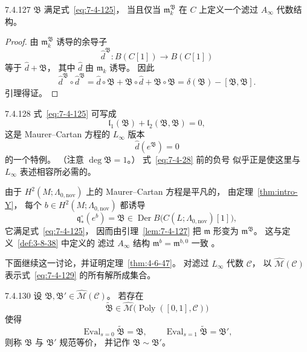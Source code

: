 \begin{lemma}{7.4.127}\label{lem:7-4-127}
$\mathfrak B$ 满足式~\eqref{eq:7-4-125}，
当且仅当 $\mathfrak m_k^{\mathfrak B}$
在 $C$ 上定义一个滤过 $A_\infty$ 代数结构。
\end{lemma}

\begin{proof}
由 $\mathfrak m_k^{\mathfrak B}$ 诱导的余导子
\[
\widehat d^{\mathfrak B}\colon
B(C[1])\longrightarrow B(C[1])
\]
等于 $\widehat d+\mathfrak B$，
其中 $\widehat d$ 由 $\mathfrak m_k$ 诱导。
因此
\[
\widehat d^{\mathfrak B}\circ
\widehat d^{\mathfrak B}
=\widehat d\circ\mathfrak B
+\mathfrak B\circ\widehat d
+\mathfrak B\circ\mathfrak B
=\delta(\mathfrak B)-[\mathfrak B,\mathfrak B].
\]
引理得证。
\end{proof}

\begin{remark}{7.4.128}\label{rem:7-4-128}
式~\eqref{eq:7-4-125} 可写成
\begin{equation}
\mathfrak l_1(\mathfrak B)
+\mathfrak l_2(\mathfrak B,\mathfrak B)=0,
\tag{7.4.125$'$}\label{eq:7-4-125-prime}
\end{equation}
这是 Maurer--Cartan 方程的 $L_\infty$ 版本
\begin{equation}
\widehat d(e^{\mathfrak B})=0
\tag{7.4.129}\label{eq:7-4-129}
\end{equation}
的一个特例。
（注意 $\deg\mathfrak B=1$。）
式~\eqref{eq:7-4-28} 前的负号
似乎正是使这里与 $L_\infty$ 表述相容所必需的。
\end{remark}

由于 $H^2(M;\Lambda_{0,\mathrm{nov}})$ 上的
Maurer--Cartan 方程是平凡的，
由定理~\ref{thm:intro-Y}，
每个 $b\in H^2(M;\Lambda_{0,\mathrm{nov}})$ 都诱导
\[
\mathfrak q^\circ_*(e^b)
=\mathfrak B
\in
\operatorname{Der}B
\bigl(C(L;\Lambda_{0,\mathrm{nov}})[1]\bigr),
\]
它满足式~\eqref{eq:7-4-125}，
因而由引理~\ref{lem:7-4-127}
把 $\mathfrak m$ 形变为 $\mathfrak m^{\mathfrak B}$。
这与定义~\ref{def:3-8-38} 中定义的
滤过 $A_\infty$ 结构
$\mathfrak m^b=\mathfrak m^{b,0}$ 一致
。

下面继续这一讨论，并证明定理~\ref{thm:4-6-47}。
对滤过 $L_\infty$ 代数 $\mathcal C$，
以 $\widehat{\mathcal M}(\mathcal C)$
表示式~\eqref{eq:7-4-129} 的所有解所成集合。

\begin{definition}{7.4.130}\label{def:7-4-130}
设
$\mathfrak B,\mathfrak B'
\in\widehat{\mathcal M}(\mathcal C)$。
若存在
\[
\widetilde{\mathfrak B}
\in
\widehat{\mathcal M}
\bigl(\operatorname{Poly}([0,1],\mathcal C)\bigr)
\]
使得
\begin{equation}
\operatorname{Eval}_{s=0}\widetilde{\mathfrak B}
=\mathfrak B,
\qquad
\operatorname{Eval}_{s=1}\widetilde{\mathfrak B}
=\mathfrak B',
\tag{7.4.131}\label{eq:7-4-131}
\end{equation}
则称 $\mathfrak B$ 与 $\mathfrak B'$ 规范等价，
并记作 $\mathfrak B\sim\mathfrak B'$。
\end{definition}

